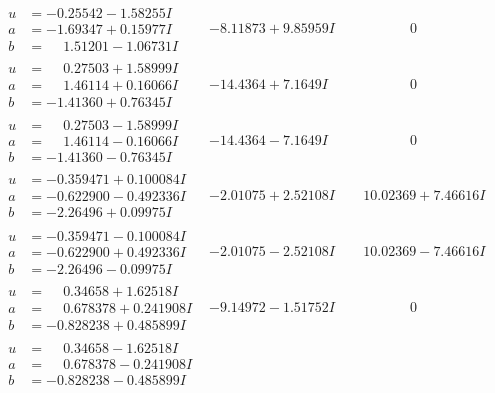 \documentclass[1p]{elsarticle_modified}
\theoremstyle{definition}
\begin{document}
$$\begin{array}{c|c|c}
 \hline 
\begin{aligned}
u &= -0.25542 - 1.58255 I \\
a &= -1.69347 + 0.15977 I \\
b &= \phantom{-}1.51201 - 1.06731 I\end{aligned}
 & -8.11873 + 9.85959 I & \phantom{-0.000000 } 0 \\ \hline\begin{aligned}
u &= \phantom{-}0.27503 + 1.58999 I \\
a &= \phantom{-}1.46114 + 0.16066 I \\
b &= -1.41360 + 0.76345 I\end{aligned}
 & -14.4364 + 7.1649 I & \phantom{-0.000000 } 0 \\ \hline\begin{aligned}
u &= \phantom{-}0.27503 - 1.58999 I \\
a &= \phantom{-}1.46114 - 0.16066 I \\
b &= -1.41360 - 0.76345 I\end{aligned}
 & -14.4364 - 7.1649 I & \phantom{-0.000000 } 0 \\ \hline\begin{aligned}
u &= -0.359471 + 0.100084 I \\
a &= -0.622900 - 0.492336 I \\
b &= -2.26496 + 0.09975 I\end{aligned}
 & -2.01075 + 2.52108 I & \phantom{-}10.02369 + 7.46616 I \\ \hline\begin{aligned}
u &= -0.359471 - 0.100084 I \\
a &= -0.622900 + 0.492336 I \\
b &= -2.26496 - 0.09975 I\end{aligned}
 & -2.01075 - 2.52108 I & \phantom{-}10.02369 - 7.46616 I \\ \hline\begin{aligned}
u &= \phantom{-}0.34658 + 1.62518 I \\
a &= \phantom{-}0.678378 + 0.241908 I \\
b &= -0.828238 + 0.485899 I\end{aligned}
 & -9.14972 - 1.51752 I & \phantom{-0.000000 } 0 \\ \hline\begin{aligned}
u &= \phantom{-}0.34658 - 1.62518 I \\
a &= \phantom{-}0.678378 - 0.241908 I \\
b &= -0.828238 - 0.485899 I\end{aligned}

\end{array}$$
\end{document}
